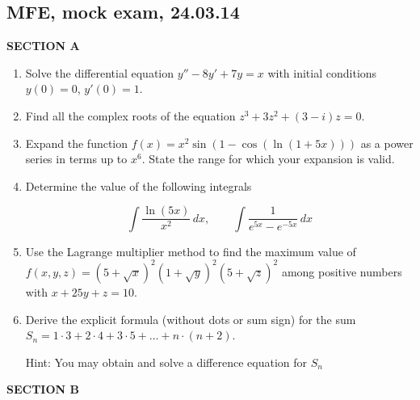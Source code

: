 \documentclass[12pt]{article} %
\theoremstyle{definition} %
\begin{document}
\subsection{MFE, mock exam, 24.03.14}

\textbf{SECTION A}

\begin{enumerate}
\item Solve the differential equation $y''-8y'+7y=x$ with initial conditions $y(0)=0$, $y'(0)=1$.



\item Find all the complex roots of the equation $z^3+3z^2+(3-i)z=0$.


\item Expand the function $f(x)=x^2\sin(1-\cos(\ln(1+5x)))$  as a power series in terms up to $x^6$. State the range for which your expansion is valid.

\item Determine the value of the following integrals

\[
\int \frac{\ln (5x)}{x^2} \, dx, \qquad \int \frac{1}{e^{5x}-e^{-5x}} \, dx
\]

\item Use the Lagrange multiplier method to find the maximum value of $f(x,y,z)=(5+\sqrt{x})^2(1+\sqrt{y})^2(5+\sqrt{z})^2$ among positive numbers with $x+25y+z=10$.


\item Derive the explicit formula (without dots or sum sign) for the sum $S_n=1\cdot 3+2\cdot 4+3\cdot 5 +\ldots+ n\cdot (n+2)$.

Hint: You may obtain and solve a difference equation for $S_n$


\end{enumerate}

\textbf{SECTION B}
\end{document}
